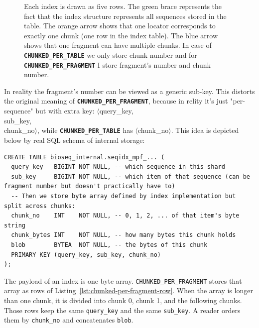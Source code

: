 \begin{figure}[htbp]
\caption[Logical concepts of the three index storage layouts]{Each index is drawn as five rows.
The green brace represents the fact that the index structure represents all sequences stored in the table.
The orange arrow shows that one locator corresponds to exactly one chunk (one row in the index table).
The blue arrow shows that one fragment can have multiple chunks.
In case of \textbf{\texttt{CHUNKED\_PER\_TABLE}} we only store chunk number and for \textbf{\texttt{CHUNKED\_PER\_FRAGMENT}} I store fragment's number and chunk number.
}
\label{fig:index-storage-layouts}
\end{figure}

\noindent\begin{minipage}{\linewidth}
In reality the fragment's number can be viewed as a generic sub-key. This distorts the original meaning of \textbf{\texttt{CHUNKED\_PER\_FRAGMENT}}, because in relity it's just 
"per-sequence" but with extra key: $\langle$query\_key,\\sub\_key,\\chunk\_no$\rangle$, while \textbf{\texttt{CHUNKED\_PER\_TABLE}} has $\langle$chunk\_no$\rangle$.
This idea is depicted below by real SQL schema of internal storage:

\begin{lstlisting}[style=bioseq-index-sql,
  caption={One heap row of a per-fragment index.},
  label={lst:chunked-per-fragment-row}]
CREATE TABLE bioseq_internal.seqidx_mpf_... (
  query_key   BIGINT NOT NULL, -- which sequence in this shard
  sub_key     BIGINT NOT NULL, -- which item of that sequence (can be fragment number but doesn't practically have to)
  -- Then we store byte array defined by index implementation but split across chunks:
  chunk_no    INT    NOT NULL, -- 0, 1, 2, ... of that item's byte string
  chunk_bytes INT    NOT NULL, -- how many bytes this chunk holds
  blob        BYTEA  NOT NULL, -- the bytes of this chunk
  PRIMARY KEY (query_key, sub_key, chunk_no)
);
\end{lstlisting}
\end{minipage}

The payload of an index is one byte array.
\texttt{CHUNKED\_PER\_FRAGMENT} stores that array as rows of Listing~\ref{lst:chunked-per-fragment-row}.
When the array is longer than one chunk, it is divided into chunk 0, chunk 1, and the following chunks.
Those rows keep the same \texttt{query\_key} and the same \texttt{sub\_key}.
A reader orders them by \texttt{chunk\_no} and concatenates \texttt{blob}.

